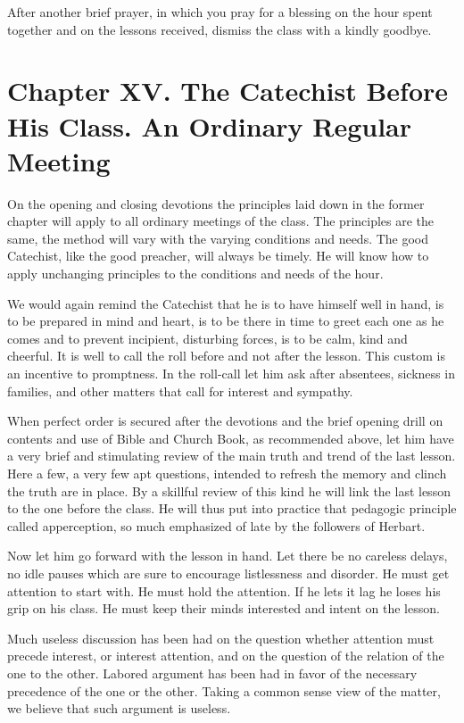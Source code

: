 After another brief prayer, in which you pray for a blessing on the hour spent together and on the lessons received, dismiss the class with a kindly goodbye.

\chapter[Chapter XV. An Ordinary Regular Meeting]{Chapter XV. The Catechist Before His Class. An Ordinary Regular Meeting}

On the opening and closing devotions the principles laid down in the former chapter will apply to all ordinary meetings of the class. The principles are the same, the method will vary with the varying conditions and needs. The good Catechist, like the good preacher, will always be timely. He will know how to apply unchanging principles to the conditions and needs of the hour.

We would again remind the Catechist that he is to have himself well in hand, is to be prepared in mind and heart, is to be there in time to greet each one as he comes and to prevent incipient, disturbing forces, is to be calm, kind and cheerful. It is well to call the roll before and not after the lesson. This custom is an incentive to promptness. In the roll-call let him ask after absentees, sickness in families, and other matters that call for interest and sympathy.

When perfect order is secured after the devotions and the brief opening drill on contents and use of Bible and Church Book, as recommended above, let him have a very brief and stimulating review of the main truth and trend of the last lesson. Here a few,
a very few apt questions, intended to refresh the memory and clinch the truth are in place. By a skillful review of this kind he will link the last lesson to the one before the class. He will thus put into practice that pedagogic principle called apperception, so much emphasized of late by the followers of Herbart.

Now let him go forward with the lesson in hand. Let there be no careless delays, no idle pauses which are sure to encourage listlessness and disorder. He must get attention to start with. He must hold the attention. If he lets it lag he loses his grip on his class. He must keep their minds interested and intent on the lesson.

Much useless discussion has been had on the question whether attention must precede interest, or interest attention, and on the question of the relation of the one to the other. Labored argument has been had in favor of the necessary precedence of the one or the other. Taking a common sense view of the matter, we believe that such argument is useless.

